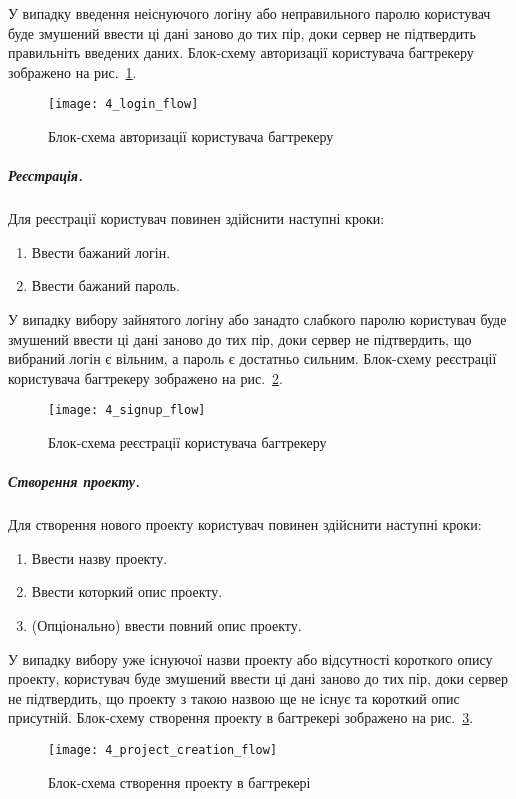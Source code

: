 \documentclass[../main.tex]{subfiles}
\begin{document}
			У випадку введення неіснуючого логіну або неправильного паролю користувач буде змушений ввести ці дані заново до тих пір, доки сервер не підтвердить правильніть введених даних. Блок-схему авторизації користувача багтрекеру зображено на рис.~\ref{flowchart_login}.
			
			\begin{figure}[H]
				\centering
				\texttt{[image: 4\_login\_flow]}
				\caption{Блок-схема авторизації користувача багтрекеру}
				\label{flowchart_login}
			\end{figure}
		
		\subparagraph{Реєстрація.}
			Для реєстрації користувач повинен здійснити наступні кроки:
			\begin{enumerate}
				\item Ввести бажаний логін.
				\item Ввести бажаний пароль.
			\end{enumerate}
			
			У випадку вибору зайнятого логіну або занадто слабкого паролю користувач буде змушений ввести ці дані заново до тих пір, доки сервер не підтвердить, що вибраний логін є вільним, а пароль є достатньо сильним. Блок-схему реєстрації користувача багтрекеру зображено на рис.~\ref{flowchart_signup}.
			
			\begin{figure}[H]
				\centering
				\texttt{[image: 4\_signup\_flow]}
				\caption{Блок-схема реєстрації користувача багтрекеру}
				\label{flowchart_signup}
			\end{figure}
		
		\subparagraph{Створення проекту.}
			Для створення нового проекту користувач повинен здійснити наступні кроки:
			\begin{enumerate}
				\item Ввести назву проекту.
				\item Ввести которкий опис проекту.
				\item (Опціонально) ввести повний опис проекту.
			\end{enumerate}
			
			У випадку вибору уже існуючої назви проекту або відсутності короткого опису проекту, користувач буде змушений ввести ці дані заново до тих пір, доки сервер не підтвердить, що проекту з такою назвою ще не існує та короткий опис присутній. Блок-схему створення проекту в багтрекері зображено на рис.~\ref{flowchart_project_creation}.
			
			\begin{figure}[H]
				\centering
				\texttt{[image: 4\_project\_creation\_flow]}
				\caption{Блок-схема створення проекту в багтрекері}
				\label{flowchart_project_creation}
			\end{figure}
		
\end{document}
